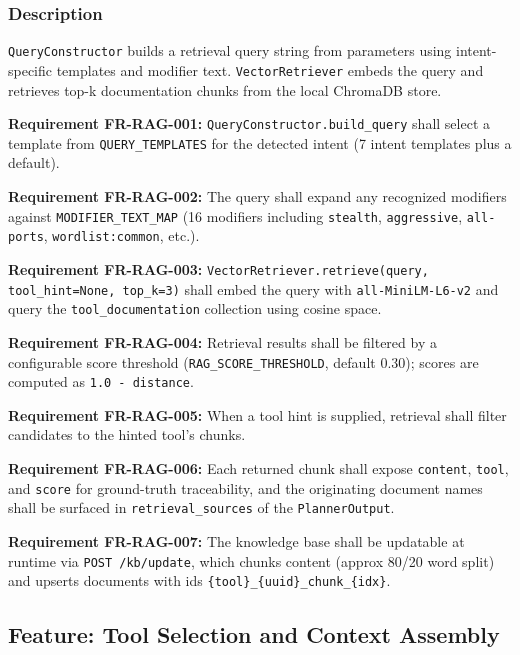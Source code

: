 \documentclass[10pt,journal,onecolumn]{IEEEtran}
\newcommand{\reqid}[1]{\textbf{#1}}
\begin{document}
\subsubsection{Description}

\texttt{QueryConstructor} builds a retrieval query string from parameters using intent-specific templates and modifier text. \texttt{VectorRetriever} embeds the query and retrieves top-k documentation chunks from the local ChromaDB store.

\reqid{Requirement FR-RAG-001:} \texttt{QueryConstructor.\allowbreak build\_\allowbreak query} shall select a template from \texttt{QUERY\_TEMPLATES} for the detected intent (7 intent templates plus a default).

\reqid{Requirement FR-RAG-002:} The query shall expand any recognized modifiers against \texttt{MODIFIER\_TEXT\_MAP} (16 modifiers including \texttt{stealth}, \texttt{aggressive}, \texttt{all-ports}, \texttt{wordlist:common}, etc.).

\reqid{Requirement FR-RAG-003:} \texttt{VectorRetriever.\allowbreak retrieve(query, tool\_\allowbreak hint=None, top\_\allowbreak k=3)} shall embed the query with \texttt{all-MiniLM-L6-v2} and query the \texttt{tool\_documentation} collection using cosine space.

\reqid{Requirement FR-RAG-004:} Retrieval results shall be filtered by a configurable score threshold (\texttt{RAG\_SCORE\_THRESHOLD}, default 0.30); scores are computed as \texttt{1.0 - distance}.

\reqid{Requirement FR-RAG-005:} When a tool hint is supplied, retrieval shall filter candidates to the hinted tool's chunks.

\reqid{Requirement FR-RAG-006:} Each returned chunk shall expose \texttt{content}, \texttt{tool}, and \texttt{score} for ground-truth traceability, and the originating document names shall be surfaced in \texttt{retrieval\_sources} of the \texttt{PlannerOutput}.

\reqid{Requirement FR-RAG-007:} The knowledge base shall be updatable at runtime via \texttt{POST /kb/update}, which chunks content (approx 80/20 word split) and upserts documents with ids \texttt{\{tool\}\_\allowbreak \{uuid\}\_\allowbreak chunk\_\allowbreak \{idx\}}.

\subsection{Feature: Tool Selection and Context Assembly}
\end{document}
